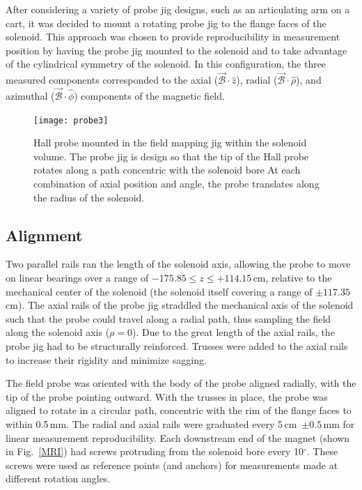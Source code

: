 After considering a variety of probe jig designs, such as an articulating arm on a cart, it was decided to mount a rotating probe jig to the flange faces of the solenoid. %
  This approach was chosen to provide reproducibility in measurement position by having the probe jig mounted to the solenoid and to take advantage of the cylindrical symmetry of the solenoid.   In this configuration, the three measured components corresponded to the axial ($\vec{\mathscr{B}}\cdot\hat{z}$), radial ($\vec{\mathscr{B}}\cdot\hat{\rho}$), and azimuthal ($\vec{\mathscr{B}}\cdot\hat{\phi}$) components of the magnetic field.
\begin{figure}%
\begin{center}
\texttt{[image: probe3]}%
\end{center}
\caption[Hall probe mounted in the field mapping jig within the solenoid volume]{Hall probe mounted in the field mapping jig within the solenoid volume.  The probe jig is design so that the tip of the Hall probe rotates along a path concentric with the solenoid bore At each combination of axial position and angle, the probe translates along the radius of the solenoid.}%
\label{probe}%
\end{figure}

\subsection{Alignment}
Two parallel rails ran the length of the solenoid axis, allowing the probe to move on linear bearings over a range of $-175.85\leq z \leq +114.15$\,cm, relative to the mechanical center of the solenoid (the solenoid itself covering a range of $\pm117.35$\,cm).  The axial rails of the probe jig straddled the mechanical axis of the solenoid such that the probe could travel along a radial path, thus sampling the field along the solenoid axis ($\rho = 0$).  Due to the great length of the axial rails, the probe jig had to be structurally reinforced.  Trusses were added to the axial rails to increase their rigidity and minimize sagging.

The field probe was oriented with the body of the probe aligned radially, with the tip of the probe pointing outward.  With the trusses in place, the probe was aligned to rotate in a circular path, concentric with the rim of the flange faces to within 0.5\,mm.  The radial and axial rails were graduated every 5\,cm~$\pm 0.5$\,mm for linear measurement reproducibility.  Each downstream end of the magnet (shown in Fig.~\ref{MRI}) had screws protruding from the solenoid bore every 10$^\circ$.  These screws were used as reference points (and anchors) for measurements made at different rotation angles.

